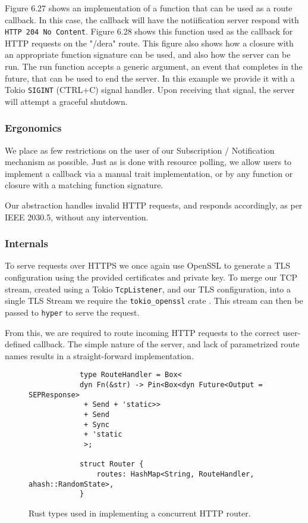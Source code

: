 Figure 6.27 shows an implementation of a function that can be used as a route callback. In this case, the callback will have the notiification server respond with \texttt{HTTP 204 No Content}. Figure 6.28 shows this function used as the callback for HTTP requests on the "/dera" route. This figure also shows how a closure with an appropriate function signature can be used, and also how the server can be run. 
The run function accepts a generic argument, an event that completes in the future, that can be used to end the server. In this example we provide it with a Tokio \texttt{SIGINT} (CTRL+C) signal handler. Upon receiving that signal, the server will attempt a graceful shutdown.

\subsubsection{Ergonomics}
We place as few restrictions on the user of our Subscription / Notification mechanism as possible. Just as is done with resource polling, we allow users to implement a callback via a manual trait implementation, or by any function or closure with a matching function signature.

Our abstraction handles invalid HTTP requests, and responds accordingly, as per IEEE 2030.5, without any intervention.

\subsubsection{Internals}
To serve requests over HTTPS we once again use OpenSSL to generate a TLS configuration using the provided certificates and private key. To merge our TCP stream, created using a Tokio \texttt{TcpListener}, and our TLS configuration, into a single TLS Stream we require the \texttt{tokio\_openssl} crate \cite{tokioopenssl}. This stream can then be passed to \texttt{hyper} to serve the request.

From this, we are required to route incoming HTTP requests to the correct user-defined callback. The simple nature of the server, and lack of parametrized route names results in a straight-forward implementation.

\begin{figure}[h]
    \begin{center}
        \begin{lstlisting}
            type RouteHandler = Box<
            dyn Fn(&str) -> Pin<Box<dyn Future<Output = SEPResponse>
             + Send + 'static>>
             + Send
             + Sync
             + 'static
             >;

            struct Router {
                routes: HashMap<String, RouteHandler, ahash::RandomState>,
            }

        \end{lstlisting}
        \label{fig:routerimpl}
        \vspace{-10pt}
        \caption{Rust types used in implementing a concurrent HTTP router.}
    \end{center}
\end{figure}

